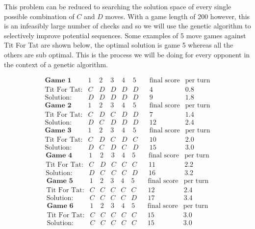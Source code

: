 This problem can be reduced to searching the solution space of every single possible combination of $C$ and $D$ moves.
With a game length of 200 however, this is an infeasibly large number of checks and so we will use the genetic algorithm to selectively improve potential sequences. Some examples of 5 move games against Tit For Tat are shown below, the optimal solution is game 5 whereas all the others are sub optimal.
This is the process we will be doing for every opponent in the context of a genetic algorithm.

$$
\begin{matrix}
     \textbf{Game 1}& 1 & 2 & 3 & 4 & 5 & &\text{final score} & \text{per turn}\\
    \text{Tit For Tat:} & C & D & D & D & D && 4 & 0.8\\
    \text{Solution:} & D & D & D & D & D && 9 & 1.8
\end{matrix}
$$
$$
\begin{matrix}
     \textbf{Game 2}& 1 & 2 & 3 & 4 & 5 & &\text{final score} & \text{per turn}\\
    \text{Tit For Tat:} & C & D & C & D & D && 7 & 1.4\\
    \text{Solution:} & D & C & D & D & D && 12 & 2.4
\end{matrix}
$$
$$
\begin{matrix}
     \textbf{Game 3}& 1 & 2 & 3 & 4 & 5 & &\text{final score} & \text{per turn}\\
    \text{Tit For Tat:} & C & D & C & D & C && 10 & 2.0\\
    \text{Solution:} & D & C & D & C & D && 15 & 3.0
\end{matrix}
$$
$$
\begin{matrix}
     \textbf{Game 4}& 1 & 2 & 3 & 4 & 5 & &\text{final score} & \text{per turn}\\
    \text{Tit For Tat:} & C & D & C & C & C && 11 & 2.2\\
    \text{Solution:} & D & C & C & C & D && 16 & 3.2 
\end{matrix}
$$
$$
\begin{matrix}
     \textbf{Game 5}& 1 & 2 & 3 & 4 & 5 & &\text{final score} & \text{per turn}\\
    \text{Tit For Tat:} & C & C & C & C & C && 12 & 2.4\\
    \text{Solution:} & C & C & C & C & D && 17 & 3.4 
\end{matrix}
$$
$$
\begin{matrix}
     \textbf{Game 6}& 1 & 2 & 3 & 4 & 5 & &\text{final score} & \text{per turn}\\
    \text{Tit For Tat:} & C & C & C & C & C && 15 & 3.0\\
    \text{Solution:} & C & C & C & C & C && 15 & 3.0 
\end{matrix}
$$

